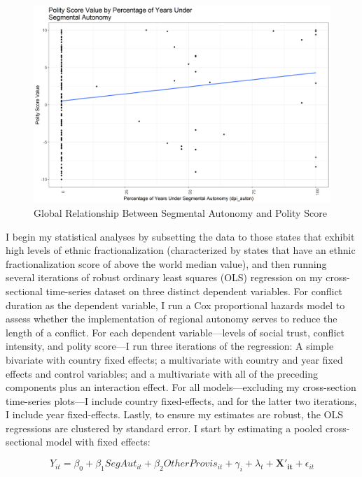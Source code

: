 \documentclass[12pt]{article}
\begin{document}
\begin{figure}[!htbp]
	\begin{center}
		\includegraphics[width = 6in]{csts_polity4_polity_score.png}
	\end{center}
	\caption{Global Relationship Between Segmental Autonomy and Polity Score}
\end{figure}

I begin my statistical analyses by subsetting the data to those states that exhibit high levels of ethnic fractionalization (characterized by states that have an ethnic fractionalization score of above the world median value), and then running several iterations of robust ordinary least squares (OLS) regression on my cross-sectional time-series dataset on three distinct dependent variables. For conflict duration as the dependent variable, I run a Cox proportional hazards model to assess whether the implementation of regional autonomy serves to reduce the length of a conflict. For each dependent variable---levels of social trust, conflict intensity, and polity score---I run three iterations of the regression: A simple bivariate with country fixed effects; a multivariate with country and year fixed effects and control variables; and a multivariate with all of the preceding components plus an interaction effect. For all models---excluding my cross-section time-series plots---I include country fixed-effects, and for the latter two iterations, I include year fixed-effects. Lastly, to ensure my estimates are robust, the OLS regressions are clustered by standard error. I start by estimating a pooled cross-sectional model with fixed effects: 

\begin{equation}
Y_{it} = \beta_0 + \beta_1 SegAut_{it} + \beta_2 OtherProvis_{it} + \gamma_i + \lambda_t + \mathbf{X'_{it}} + \epsilon_{it}
\end{equation}
\end{document}
